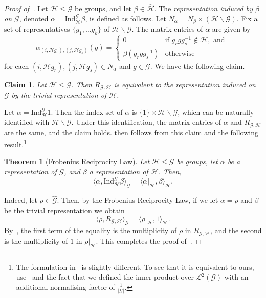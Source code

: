 \documentclass[a4paper,11pt]{article}
\newtheorem{theorem}{Theorem}[section]
\newtheorem*{claim*}{Claim}
\theoremstyle{definition}
\newcommand{\gr}{\mathscr{G}}
\newcommand{\sgr}{\mathscr{H}}
\newcommand{\Ind}{\mathrm{Ind}}
\begin{document}
\begin{proof}[Proof of~]

Let $\sgr \leq \gr$ be groups, and let $\beta\in \widehat{\sgr}$. The \emph{representation induced by $\beta$ on $\gr$}, denoted 
$\alpha= \Ind_{\sgr}^\gr \beta$, is defined as follows.
Let $N_\alpha = N_\beta \times (\sgr \backslash \gr)$. Fix a set of representatives $\{ g_1,\dots g_k\}$ of $\sgr \backslash \gr$. 
The matrix entries of $\alpha$ are given by 
\[
\alpha_{(i, \sgr g_r), (j,\sgr g_s)}(g)= \begin{cases}
    0 & \text{if } g_r g g_s^{-1} \not\in \sgr, \text{ and } \\
    \beta(g_r g g_s^{-1}) &\text{otherwise }
\end{cases}
\]
for each $(i, \sgr g_r), (j,\sgr g_s)\in N_\alpha$ and $ g\in \gr$.
We have the following claim.

\begin{claim*}
    Let $\sgr \leq \gr$. Then $R_{\gr,\sgr}$ is equivalent to the representation induced on $\gr$ by the trivial representation of $\sgr$.
\end{claim*}
Let $\alpha= \Ind_\sgr^\gr 1$. Then the index set of $\alpha$ is $\{1\} \times
  \sgr \backslash \gr$, which can be naturally identified with $\sgr \backslash
  \gr$. Under this identification, the matrix entries of $\alpha$ and
  $R_{\gr,\sgr}$ are the same, and the claim holds.
 then follows from this claim and the
  following result.\footnote{The formulation in~\cite{Terras_1999} is slightly different. To see that it is equivalent to ours, use~\cite[Proposition 3.2]{Terras_1999} and the fact that we defined the inner product over $\mathcal{L}^2(\gr)$ with an additional normalising factor of $\frac{1}{|\gr|}$.}

\begin{theorem}[Frobenius Reciprocity Law]
Let $\sgr \leq \gr$ be groups, let $\alpha$ be a representation of $\gr$, and $\beta$ a representation of $\sgr$. Then,
\[
\langle 
\alpha, \Ind_{\sgr}^\gr \beta
\rangle_{\gr} =
\langle \alpha\vert_\sgr, \beta \rangle_{\sgr}.
\]
\end{theorem}

Indeed, let $\rho\in \widehat{\gr}$. Then, by the Frobenius Reciprocity Law, if we let $\alpha=\rho$ and $\beta$ be the trivial representation we obtain
\[
\langle 
\rho, R_{\gr,\sgr}
\rangle_{\gr} =
\langle \rho\vert_\sgr, 1 \rangle_{\sgr}.
\]
By~,
the first term of the equality is the multiplicity of $\rho$ in $R_{\gr,\sgr}$,
  and the second is the multiplicity of $1$ in $\rho\vert_\sgr$.
  This completes
  the proof of~.
\end{proof}
\end{document}
